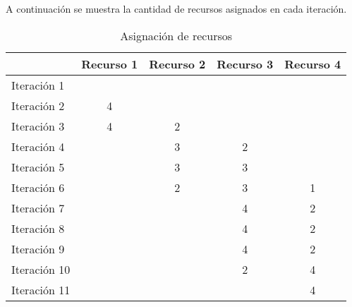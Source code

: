 A continuación se muestra la cantidad de recursos
asignados en cada iteración.

{\footnotesize
\begin{longtable}[c]{l|c|c|c|c|}
\caption{Asignación de recursos} \\

 & \textbf{Recurso 1} & \textbf{Recurso 2} & \textbf{Recurso 3}
& \textbf{Recurso 4} \\
\hline \hline
\endhead

Iteración  1 &   &   &   &   \\
Iteración  2 & 4 &   &   &   \\
Iteración  3 & 4 & 2 &   &   \\
Iteración  4 &   & 3 & 2 &   \\
Iteración  5 &   & 3 & 3 &   \\
Iteración  6 &   & 2 & 3 & 1 \\
Iteración  7 &   &   & 4 & 2 \\
Iteración  8 &   &   & 4 & 2 \\
Iteración  9 &   &   & 4 & 2 \\
Iteración 10 &   &   & 2 & 4 \\
Iteración 11 &   &   &   & 4 \\
\hline
\end{longtable}
}

